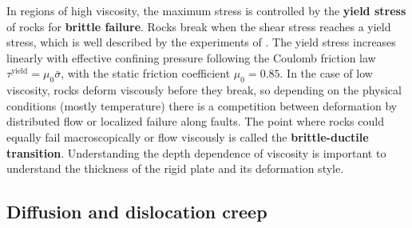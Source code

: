 \documentclass[letterpaper,12pt,]{memoir}
\begin{document}
In regions of high viscosity, the maximum stress is controlled by the \textbf{yield stress} of rocks for \textbf{brittle failure}. Rocks break when the shear stress reaches a yield stress, which is well described by the experiments of \cite{byerlee78a}. The yield stress increases linearly with effective confining pressure following the Coulomb friction law $\tau^\text{yield}=\mu_0\bar{\sigma}$, with the static friction coefficient $\mu_0=0.85$. In the case of low viscosity, rocks deform viscously before they break, so depending on the physical conditions (mostly temperature) there is a competition between deformation by distributed flow or localized failure along faults. The point where rocks could equally fail macroscopically or flow viscously is called the \textbf{brittle-ductile transition}. Understanding the depth dependence of viscosity is important to understand the thickness of the rigid plate and its deformation style.

\subsection{Diffusion and dislocation creep}
\end{document}
